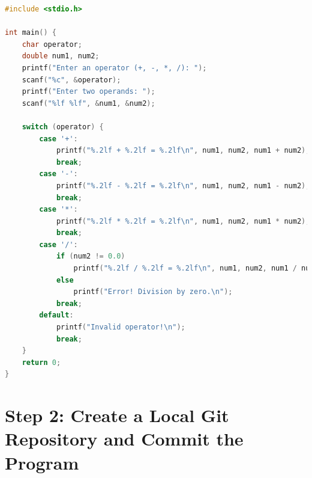 \documentclass[12pt, a4paper]{article}
\begin{document}
\begin{lstlisting}[language=C, basicstyle=\ttfamily\footnotesize, keywordstyle=\color{blue}]
#include <stdio.h>

int main() {
    char operator;
    double num1, num2;
    printf("Enter an operator (+, -, *, /): ");
    scanf("%c", &operator);
    printf("Enter two operands: ");
    scanf("%lf %lf", &num1, &num2);

    switch (operator) {
        case '+':
            printf("%.2lf + %.2lf = %.2lf\n", num1, num2, num1 + num2);
            break;
        case '-':
            printf("%.2lf - %.2lf = %.2lf\n", num1, num2, num1 - num2);
            break;
        case '*':
            printf("%.2lf * %.2lf = %.2lf\n", num1, num2, num1 * num2);
            break;
        case '/':
            if (num2 != 0.0)
                printf("%.2lf / %.2lf = %.2lf\n", num1, num2, num1 / num2);
            else
                printf("Error! Division by zero.\n");
            break;
        default:
            printf("Invalid operator!\n");
            break;
    }
    return 0;
}
\end{lstlisting}
\newpage
{}
\vspace{-2 cm}
\section*{Step 2: Create a Local Git Repository and Commit the Program}
\end{document}

